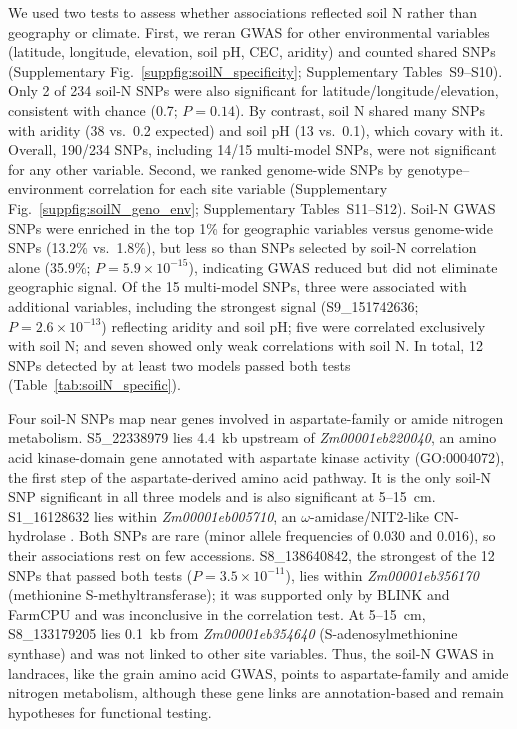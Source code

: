 We used two tests to assess whether associations reflected soil N rather than geography or climate. First, we reran GWAS for other environmental variables (latitude, longitude, elevation, soil pH, CEC, aridity) and counted shared SNPs (Supplementary Fig.~\ref{suppfig:soilN_specificity}; Supplementary Tables~S9--S10). Only 2 of 234 soil-N SNPs were also significant for latitude/longitude/elevation, consistent with chance (0.7; $P = 0.14$). By contrast, soil N shared many SNPs with aridity (38 vs.\ 0.2 expected) and soil pH (13 vs.\ 0.1), which covary with it. Overall, 190/234 SNPs, including 14/15 multi-model SNPs, were not significant for any other variable. Second, we ranked genome-wide SNPs by genotype--environment correlation for each site variable (Supplementary Fig.~\ref{suppfig:soilN_geno_env}; Supplementary Tables~S11--S12). Soil-N GWAS SNPs were enriched in the top 1\% for geographic variables versus genome-wide SNPs (13.2\% vs.\ 1.8\%), but less so than SNPs selected by soil-N correlation alone (35.9\%; $P = 5.9 \times 10^{-15}$), indicating GWAS reduced but did not eliminate geographic signal. Of the 15 multi-model SNPs, three were associated with additional variables, including the strongest signal (S9\_151742636; $P = 2.6 \times 10^{-13}$) reflecting aridity and soil pH; five were correlated exclusively with soil N; and seven showed only weak correlations with soil N. In total, 12 SNPs detected by at least two models passed both tests (Table~\ref{tab:soilN_specific}).

Four soil-N SNPs map near genes involved in aspartate-family or amide nitrogen metabolism. S5\_22338979 lies 4.4~kb upstream of \textit{Zm00001eb220040}, an amino acid kinase-domain gene annotated with aspartate kinase activity (GO:0004072), the first step of the aspartate-derived amino acid pathway. It is the only soil-N SNP significant in all three models and is also significant at 5--15~cm. S1\_16128632 lies within \textit{Zm00001eb005710}, an $\omega$-amidase/NIT2-like CN-hydrolase \citep{Zhang2014OmegaAmidase}. Both SNPs are rare (minor allele frequencies of 0.030 and 0.016), so their associations rest on few accessions. S8\_138640842, the strongest of the 12 SNPs that passed both tests ($P = 3.5\times10^{-11}$), lies within \textit{Zm00001eb356170} (methionine S-methyltransferase); it was supported only by BLINK and FarmCPU and was inconclusive in the correlation test. At 5--15~cm, S8\_133179205 lies 0.1~kb from \textit{Zm00001eb354640} (S-adenosylmethionine synthase) and was not linked to other site variables. Thus, the soil-N GWAS in landraces, like the grain amino acid GWAS, points to aspartate-family and amide nitrogen metabolism, although these gene links are annotation-based and remain hypotheses for functional testing.

